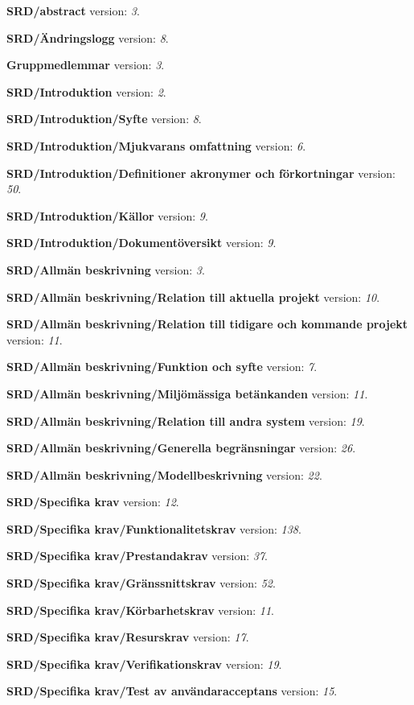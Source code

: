 \documentclass[a4paper, twoside, 11pt, titlepage]{article}
\begin{document}
\textbf{SRD/abstract} version: \emph{3}.

\textbf{SRD/Ändringslogg} version: \emph{8}.

\textbf{Gruppmedlemmar} version: \emph{3}.

\textbf{SRD/Introduktion} version: \emph{2}.

\textbf{SRD/Introduktion/Syfte} version: \emph{8}.

\textbf{SRD/Introduktion/Mjukvarans omfattning} version: \emph{6}.

\textbf{SRD/Introduktion/Definitioner akronymer och förkortningar} version: \emph{50}.

\textbf{SRD/Introduktion/Källor} version: \emph{9}.

\textbf{SRD/Introduktion/Dokumentöversikt} version: \emph{9}.

\textbf{SRD/Allmän beskrivning} version: \emph{3}.

\textbf{SRD/Allmän beskrivning/Relation till aktuella projekt} version: \emph{10}.

\textbf{SRD/Allmän beskrivning/Relation till tidigare och kommande projekt} version: \emph{11}.

\textbf{SRD/Allmän beskrivning/Funktion och syfte} version: \emph{7}.

\textbf{SRD/Allmän beskrivning/Miljömässiga betänkanden} version: \emph{11}.

\textbf{SRD/Allmän beskrivning/Relation till andra system} version: \emph{19}.

\textbf{SRD/Allmän beskrivning/Generella begränsningar} version: \emph{26}.

\textbf{SRD/Allmän beskrivning/Modellbeskrivning} version: \emph{22}.

\textbf{SRD/Specifika krav} version: \emph{12}.

\textbf{SRD/Specifika krav/Funktionalitetskrav} version: \emph{138}.

\textbf{SRD/Specifika krav/Prestandakrav} version: \emph{37}.

\textbf{SRD/Specifika krav/Gränssnittskrav} version: \emph{52}.

\textbf{SRD/Specifika krav/Körbarhetskrav} version: \emph{11}.

\textbf{SRD/Specifika krav/Resurskrav} version: \emph{17}.

\textbf{SRD/Specifika krav/Verifikationskrav} version: \emph{19}.

\textbf{SRD/Specifika krav/Test av användaracceptans} version: \emph{15}.
\end{document}
